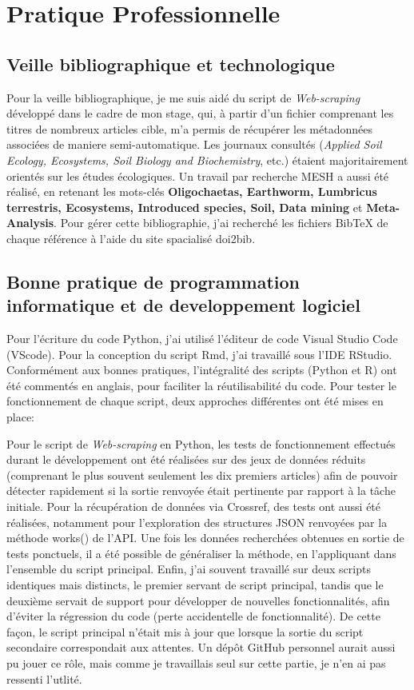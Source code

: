 \documentclass{book}
\begin{document}
\section{Pratique Professionnelle}

\subsection{Veille bibliographique et technologique}
\noindent
Pour la veille bibliographique, je me suis aidé du script de \textit{Web-scraping} développé dans le cadre de mon stage, qui, à partir d'un fichier comprenant les titres de nombreux articles cible, m'a permis de récupérer les métadonnées associées de maniere semi-automatique. Les journaux consultés (\textit{Applied Soil Ecology, Ecosystems, Soil Biology and Biochemistry}, etc.) étaient majoritairement orientés sur les études écologiques. Un travail par recherche MESH a aussi été réalisé, en retenant les mots-clés \textbf{Oligochaetas, Earthworm, Lumbricus terrestris, Ecosystems, Introduced species, Soil, Data mining} et \textbf{Meta-Analysis}. Pour gérer cette bibliographie, j'ai recherché les fichiers BibTeX de chaque référence à l'aide du site spacialisé doi2bib.

\subsection[Bonnes pratiques]{Bonne pratique de programmation informatique et
    de developpement logiciel}
\noindent
Pour l'écriture du code Python, j'ai utilisé l'éditeur de code Visual Studio Code (VScode). Pour la conception du script Rmd, j'ai travaillé sous l'IDE RStudio. Conformément aux bonnes pratiques, l'intégralité des scripts (Python et R) ont été commentés en anglais, pour faciliter la réutilisabilité du code. Pour tester le fonctionnement de chaque script, deux approches différentes ont été mises en place: 

Pour le script de \textit{Web-scraping} en Python, les tests de fonctionnement effectués durant le développement ont été réalisées sur des jeux de données réduits (comprenant le plus souvent seulement les dix premiers articles) afin de pouvoir détecter rapidement si la sortie renvoyée était pertinente par rapport à la tâche initiale. Pour la récupération de données via Crossref, des tests ont aussi été réalisées, notamment pour l'exploration des structures JSON renvoyées par la méthode works() de l'API. Une fois les données recherchées obtenues en sortie de tests ponctuels, il a été possible de généraliser la méthode, en l'appliquant dans l'ensemble du script principal. Enfin, j'ai souvent travaillé sur deux scripts identiques mais distincts, le premier servant de script principal, tandis que le deuxième servait de support pour développer de nouvelles fonctionnalités, afin d'éviter la régression du code (perte accidentelle de fonctionnalité). De cette façon, le script principal n'était mis à jour que lorsque la sortie du script secondaire correspondait aux attentes. Un dépôt GitHub personnel aurait aussi pu jouer ce rôle, mais comme je travaillais seul sur cette partie, je n'en ai pas ressenti l'utlité.
    
\end{document}
